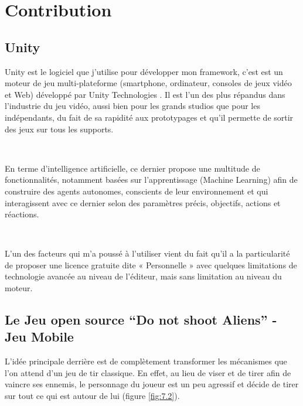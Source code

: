 
\chapter{Contribution} %

\label{Chapter3} %


\section{Unity}

Unity est le logiciel que j'utilise pour développer mon framework, c’est est un moteur de jeu multi-plateforme (smartphone, ordinateur, consoles de jeux vidéo et Web) développé par Unity Technologies \parencite{unity1}. Il est l'un des plus répandus dans l'industrie du jeu vidéo, aussi bien pour les grands studios que pour les indépendants, du fait de sa rapidité aux prototypages et qu'il permette de sortir des jeux sur tous les supports.


~\par
En terme d’intelligence artificielle, ce dernier propose une multitude de fonctionnalités, notamment basées sur l’apprentissage (Machine Learning) afin de construire des agents autonomes, conscients de leur environnement et qui interagissent avec ce dernier selon des paramètres précis, objectifs, actions et réactions.

~\par
L’un des facteurs qui m’a poussé à l’utiliser vient du fait qu'il a la particularité de proposer une licence gratuite dite « Personnelle » avec quelques limitations de technologie avancée au niveau de l'éditeur, mais sans limitation au niveau du moteur.  



\section{Le Jeu open source “Do not shoot Aliens” - Jeu Mobile}

L'idée principale derrière est de complètement transformer les mécanismes que l’on attend d'un jeu de tir classique. En effet, au lieu de viser et de tirer afin de vaincre ses ennemis, le personnage du joueur est un peu agressif et décide de tirer sur tout ce qui est autour de lui (figure \ref{fig:7.2}). 

